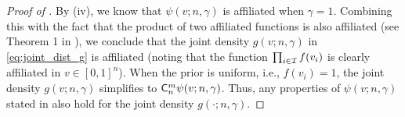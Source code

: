 \begin{proof}[Proof of ]
By  (iv), we know that $\psi(v;n,\gamma)$ is affiliated when $\gamma=1$. Combining this with the fact that the product of two affiliated functions is also affiliated (see Theorem 1 in \citet{milgrom_1982_auctiontheory_competitive_bidding}), we conclude that the joint density $g(v;n,\gamma)$ in \eqref{eq:joint_dist_g} is affiliated (noting that the function $\prod_{i\in \mathcal{I}} f(v_i)$ is clearly affiliated in $v \in [0,1]^n$). When the prior is uniform, i.e., $f(v_i)=1$, the joint density $g(v;n,\gamma)$ simplifies to $\mathsf{C}^m_n \psi(v;n,\gamma)$. Thus, any properties of $\psi(v;n,\gamma)$ stated in  also hold for the joint density $g(\cdot;n,\gamma)$.
\end{proof}





